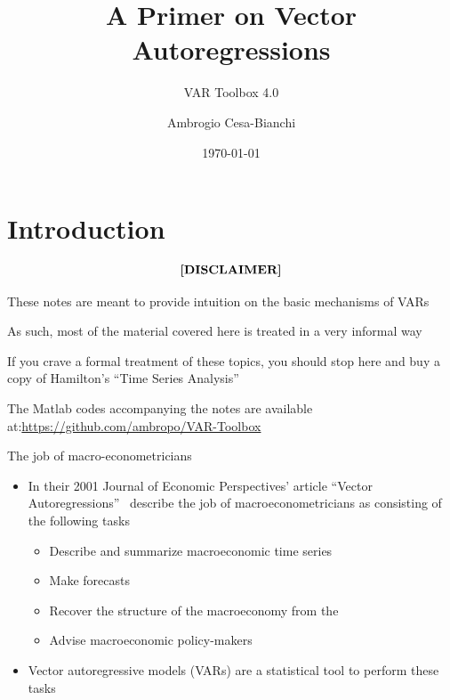 \documentclass[10pt,handout]{beamer}
\title[VAR models]{\textbf{A Primer on Vector Autoregressions}}
\subtitle{VAR Toolbox 4.0}
\author[]{Ambrogio Cesa-Bianchi}
\date{\today}
\begin{document}
\section{Introduction}
\begin{frame}[plain]
\titlepage
\end{frame}
\shownotesblock{}

\begin{frame}
\bigskip\bigskip
\begin{equation*}
\text{\textbf{[DISCLAIMER]}}
\end{equation*}
\bigskip \bigskip
\centering
\begin{minipage}{.8\textwidth}
These notes are meant to provide intuition on the basic mechanisms of VARs \par\bigskip
As such, most of the material covered here is treated in a very informal way \par\bigskip
If you crave a formal treatment of these topics, you should stop here and buy a copy of Hamilton's \textquotedblleft Time Series Analysis\textquotedblright \par\bigskip
The Matlab codes accompanying the notes are available at:\newline \url{https://github.com/ambropo/VAR-Toolbox}
\end{minipage}
\end{frame}
\shownotesblock{}

\begin{frame}
{The job of macro-econometricians}
\begin{itemize}
\item In their 2001 Journal of Economic Perspectives' article \textquotedblleft Vector Autoregressions\textquotedblright\ \cite{StockWatson2001} describe the job of macroeconometricians as consisting of the following tasks \smallskip
\begin{itemize}
\item Describe and summarize macroeconomic time series \smallskip
\item Make forecasts \smallskip
\item Recover the structure of the macroeconomy from the  \smallskip
\item Advise macroeconomic policy-makers\bigskip \pause \medskip
\end{itemize}
\item Vector autoregressive models (VARs) are a statistical tool to perform
these tasks
\end{itemize}
\end{frame}
\shownotesblock{}
\end{document}
